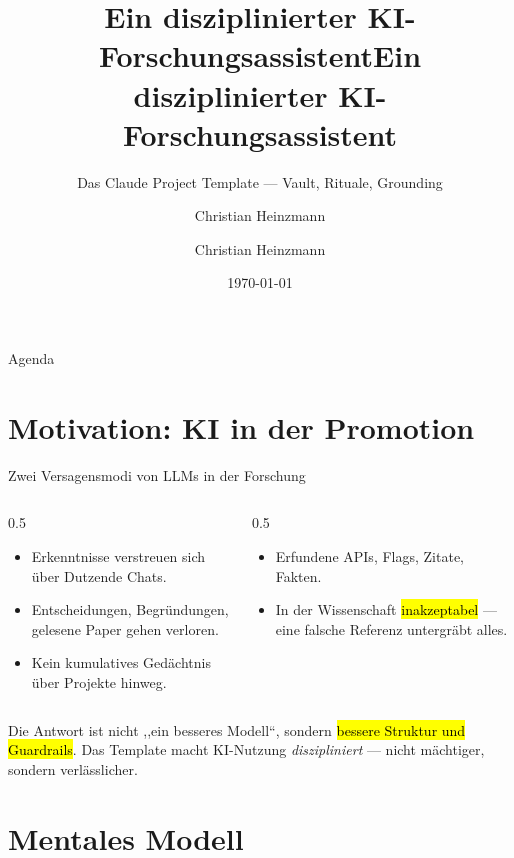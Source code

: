 \documentclass[aspectratio=169,11pt]{beamer}
\title{Ein disziplinierter KI-Forschungsassistent}
\subtitle{Das Claude Project Template --- Vault, Rituale, Grounding}
\author{Christian Heinzmann}
\institute{Hochschule Heilbronn \textperiodcentered\ Promotionskolleg}
\date{\today}
\title[Claude Project Template]{Ein disziplinierter KI-Forschungsassistent}
\author[C. Heinzmann]{Christian Heinzmann}
\begin{document}
\hhntitleframe

\begin{frame}{Agenda}
  \tableofcontents
\end{frame}

\section{Motivation: KI in der Promotion}

\begin{frame}{Zwei Versagensmodi von LLMs in der Forschung}
  \begin{columns}[T]
    \begin{column}{0.5\textwidth}
      \begin{itemize}
        \item Erkenntnisse verstreuen sich über Dutzende Chats.
        \item Entscheidungen, Begründungen, gelesene Paper gehen verloren.
        \item Kein kumulatives Gedächtnis über Projekte hinweg.
      \end{itemize}
    \end{column}
    \begin{column}{0.5\textwidth}
      \begin{itemize}
        \item Erfundene APIs, Flags, Zitate, Fakten.
        \item In der Wissenschaft \hl{inakzeptabel} ---
              eine falsche Referenz untergräbt alles.
      \end{itemize}
    \end{column}
  \end{columns}
  \vfill
  \begin{takeaway}[These]
    Die Antwort ist nicht ,,ein besseres Modell``, sondern \hl{bessere Struktur
    und Guardrails}. Das Template macht KI-Nutzung \emph{diszipliniert} ---
    nicht mächtiger, sondern verlässlicher.
  \end{takeaway}
\end{frame}

\section{Mentales Modell}
\end{document}
